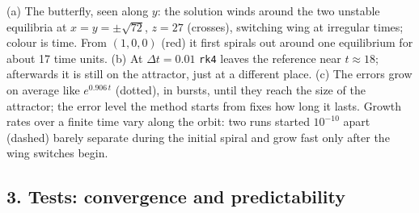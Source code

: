\documentclass[11pt,a4paper]{article}
\begin{document}
\begin{center}
\end{center}
(a) The butterfly, seen along $y$: the solution winds around the two unstable
equilibria at $x = y = \pm\sqrt{72}$, $z = 27$ (crosses), switching wing at
irregular times; colour is time. From $(1, 0, 0)$ (red) it first spirals out
around one equilibrium for about 17 time units. (b) At $\Delta t = 0.01$ \texttt{rk4} leaves the
reference near $t \approx 18$; afterwards it is still on the attractor, just
at a different place. (c) The errors grow on average like $e^{0.906\,t}$
(dotted), in bursts, until they reach the size of the attractor; the error
level the method starts from fixes how long it lasts. Growth rates over a
finite time vary along the orbit: two runs started $10^{-10}$ apart (dashed)
barely separate during the initial spiral and grow fast only after the wing
switches begin.

\newpage
\subsection*{3. Tests: convergence and predictability}
\end{document}
